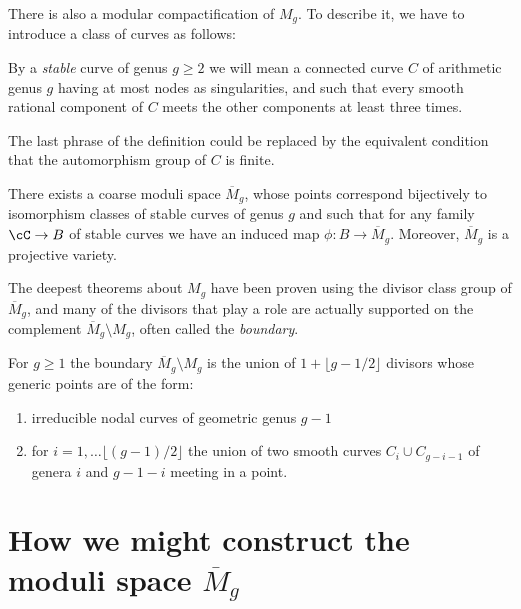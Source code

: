 There is also a modular compactification of $M_g$. To describe it, we have to introduce a class of curves as follows:

\begin{definition}
By a \emph{stable} curve of genus $g \geq 2$ we will mean a connected curve $C$ of arithmetic genus $g$ having at most nodes as singularities,  and such that every smooth rational component of $C$ meets the other components at least three times.
\end{definition}

The last phrase of the definition could be replaced by the equivalent condition that the automorphism group
of $C$ is finite.


\begin{theorem}\label{stable moduli}
There exists a coarse moduli space $\overline M_g$, whose points correspond bijectively to isomorphism classes of stable curves of genus $g$ and such that for any family $\cC \to B$ of stable curves we have an induced map $\phi : B \to \overline M_g$. Moreover, $\overline M_g$ is a projective variety.
\end{theorem}


The deepest theorems about $M_{g}$ have been proven using the divisor class group of $\overline M_{g}$,
and many of the divisors that play a role are actually supported on the complement $\overline M_{g} \setminus M_{g}$, often called the \emph{boundary}.

\begin{fact}
\begin{proposition}
For $g\geq 1$ the boundary $\overline M_{g}\setminus M_{g}$ is the union of $1+\lfloor{g-1/2}\rfloor$ divisors whose generic points are of the form:
\begin{enumerate}
 \item irreducible nodal curves of geometric genus $g-1$
 \item for $i = 1, \dots \lfloor{(g-1)/2}\rfloor$ the union of two smooth curves $C_{i}\cup C_{g-i-1}$ of genera
 $i$ and $g-1-i$ meeting in a point.
\end{enumerate}
\end{proposition}
\end{fact}


\section{How we might construct the moduli space $\overline M_g$}

